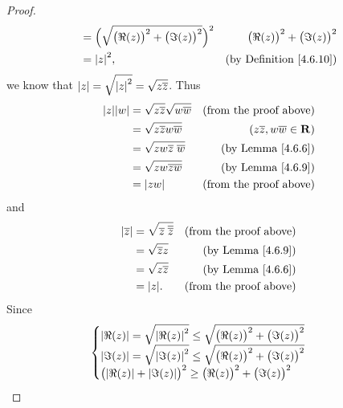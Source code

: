 \begin{proof}
\begin{align*}
                       & = \Big(\sqrt{\big(\Re(z)\big)^2 + \big(\Im(z)\big)^2}\Big)^2                                    & \big(\Re(z)\big)^2 + \big(\Im(z)\big)^2 \\
                       & = \abs*{z}^2,                                                                                   & \text{(by Definition \ref{4.6.10})}
    \end{align*}
    we know that \(\abs*{z} = \sqrt{\abs*{z}^2} = \sqrt{z \overline{z}}\).
    Thus
    \begin{align*}
        \abs*{z} \abs*{w} & = \sqrt{z \overline{z}} \sqrt{w \overline{w}} & \text{(from the proof above)}                   \\
                          & = \sqrt{z \overline{z} w \overline{w}}        & (z \overline{z}, w \overline{w} \in \mathbf{R}) \\
                          & = \sqrt{zw \overline{z} \; \overline{w}}      & \text{(by Lemma \ref{4.6.6})}                   \\
                          & = \sqrt{zw \overline{zw}}                     & \text{(by Lemma \ref{4.6.9})}                   \\
                          & = \abs*{zw}                                   & \text{(from the proof above)}
    \end{align*}
    and
    \begin{align*}
        \abs*{\overline{z}} & = \sqrt{\overline{z} \; \overline{\overline{z}}} & \text{(from the proof above)} \\
                            & = \sqrt{\overline{z} z}                          & \text{(by Lemma \ref{4.6.9})} \\
                            & = \sqrt{z \overline{z}}                          & \text{(by Lemma \ref{4.6.6})} \\
                            & = \abs*{z}.                                      & \text{(from the proof above)}
    \end{align*}
    Since
    \begin{align*}
                 & \begin{cases}
                       \abs*{\Re(z)} = \sqrt{\abs*{\Re(z)}^2} \leq \sqrt{\big(\Re(z)\big)^2 + \big(\Im(z)\big)^2} \\
                       \abs*{\Im(z)} = \sqrt{\abs*{\Im(z)}^2} \leq \sqrt{\big(\Re(z)\big)^2 + \big(\Im(z)\big)^2} \\
                       \big(\abs*{\Re(z)} + \abs*{\Im(z)}\big)^2 \geq \big(\Re(z)\big)^2 + \big(\Im(z)\big)^2

\end{cases}
\end{align*}
\end{proof}

